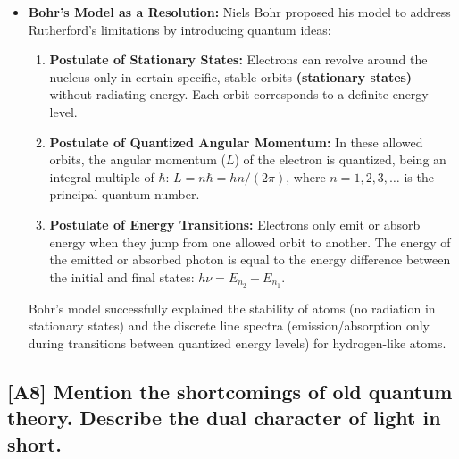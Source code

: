 \documentclass[12pt]{article}
\begin{document}
\begin{itemize}
    \item \textbf{Bohr's Model as a Resolution:} Niels Bohr proposed his model to address Rutherford's limitations by introducing quantum ideas:
    \begin{enumerate}[label=\roman*.]
        \item \textbf{Postulate of Stationary States:} Electrons can revolve around the nucleus only in certain specific, stable orbits\textbf{ (stationary states)} without radiating energy. Each orbit corresponds to a definite energy level.
        \item \textbf{Postulate of Quantized Angular Momentum:} In these allowed orbits, the angular momentum ($L$) of the electron is quantized, being an integral multiple of $\hbar$: $L=n\hbar=h n/(2\pi)$, where $n=1,2,3,\dots$ is the principal quantum number.
        \item \textbf{Postulate of Energy Transitions:} Electrons only emit or absorb energy when they jump from one allowed orbit to another. The energy of the emitted or absorbed photon is equal to the energy difference between the initial and final states: $h\nu=E_{n_2}-E_{n_1}$.
    \end{enumerate}
    Bohr's model successfully explained the stability of atoms (no radiation in stationary states) and the discrete line spectra (emission/absorption only during transitions between quantized energy levels) for hydrogen-like atoms.
\end{itemize}

\subsection{[A8] Mention the shortcomings of old quantum theory. Describe the dual character of light in short.}
\end{document}
